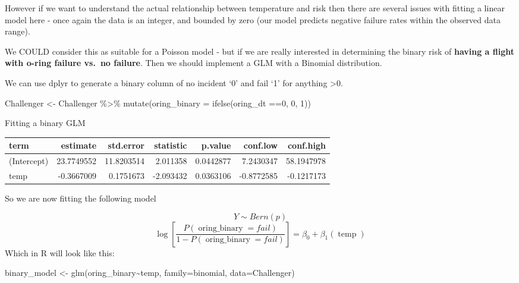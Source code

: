 \documentclass[
]{book}
\newenvironment{Shaded}{\begin{snugshade}}{\end{snugshade}}
\newcommand{\AttributeTok}[1]{\textcolor[rgb]{0.77,0.63,0.00}{#1}}
\newcommand{\DecValTok}[1]{\textcolor[rgb]{0.00,0.00,0.81}{#1}}
\newcommand{\FunctionTok}[1]{\textcolor[rgb]{0.00,0.00,0.00}{#1}}
\newcommand{\NormalTok}[1]{#1}
\newcommand{\OtherTok}[1]{\textcolor[rgb]{0.56,0.35,0.01}{#1}}
\newcommand{\SpecialCharTok}[1]{\textcolor[rgb]{0.00,0.00,0.00}{#1}}
\newcommand{\StringTok}[1]{\textcolor[rgb]{0.31,0.60,0.02}{#1}}
\begin{document}
However if we want to understand the actual relationship between temperature and risk then there are several issues with fitting a linear model here - once again the data is an integer, and bounded by zero (our model predicts negative failure rates within the observed data range).

We COULD consider this as suitable for a Poisson model - but if we are really interested in determining the binary risk of \textbf{having a flight with o-ring failure vs.~no failure}. Then we should implement a GLM with a Binomial distribution.

We can use dplyr to generate a binary column of no incident `0' and fail `1' for anything \textgreater0.

\begin{Shaded}
\begin{Highlighting}[]
\NormalTok{Challenger }\OtherTok{\textless{}{-}}\NormalTok{ Challenger }\SpecialCharTok{\%\textgreater{}\%} 
  \FunctionTok{mutate}\NormalTok{(}\AttributeTok{oring\_binary =} \FunctionTok{ifelse}\NormalTok{(oring\_dt }\SpecialCharTok{==}\StringTok{\textquotesingle{}0\textquotesingle{}}\NormalTok{, }\DecValTok{0}\NormalTok{, }\DecValTok{1}\NormalTok{))}
\end{Highlighting}
\end{Shaded}

Fitting a binary GLM

\begin{table}[H]
\centering
\begin{tabular}[t]{l|r|r|r|r|r|r}
\hline
term & estimate & std.error & statistic & p.value & conf.low & conf.high\\
\hline
(Intercept) & 23.7749552 & 11.8203514 & 2.011358 & 0.0442877 & 7.2430347 & 58.1947978\\
\hline
temp & -0.3667009 & 0.1751673 & -2.093432 & 0.0363106 & -0.8772585 & -0.1217173\\
\hline
\end{tabular}
\end{table}

So we are now fitting the following model

\[
 Y \sim Bern(p)
\]
\[
\log\left[ \frac { P( \operatorname{oring\_binary} = fail) }{ 1 - P( \operatorname{oring\_binary} = fail) } \right] = \beta_{0} + \beta_{1}(\operatorname{temp})
\]
Which in R will look like this:

\begin{Shaded}
\begin{Highlighting}[]
\NormalTok{binary\_model }\OtherTok{\textless{}{-}} \FunctionTok{glm}\NormalTok{(oring\_binary}\SpecialCharTok{\textasciitilde{}}\NormalTok{temp, }\AttributeTok{family=}\NormalTok{binomial, }\AttributeTok{data=}\NormalTok{Challenger)}
\end{Highlighting}
\end{Shaded}
\end{document}
